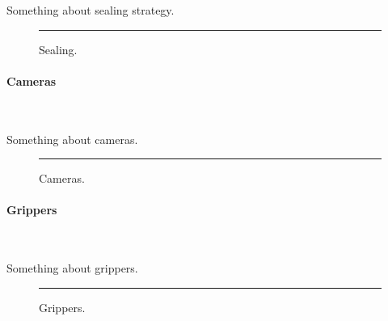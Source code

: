 Something about sealing strategy. \lipsum[1]

\begin{figure}[h]
    \centering
    \rule{0.8\columnwidth}{4cm}
    \caption{Sealing.}
    \label{fig:sealing}
\end{figure}

\vspace{-0.3cm}
\paragraph{Cameras} \ \\
\vspace{-0.5cm}

Something about cameras. \lipsum[1]

\begin{figure}[h]
    \centering
    \rule{0.8\columnwidth}{4cm}
    \caption{Cameras.}
    \label{fig:cameras}
\end{figure}

\vspace{-0.3cm}
\paragraph{Grippers} \ \\
\vspace{-0.5cm}

Something about grippers. \lipsum[1]

\begin{figure}[h]
    \centering
    \rule{0.8\columnwidth}{4cm}
    \caption{Grippers.}
    \label{fig:grippers}
\end{figure}